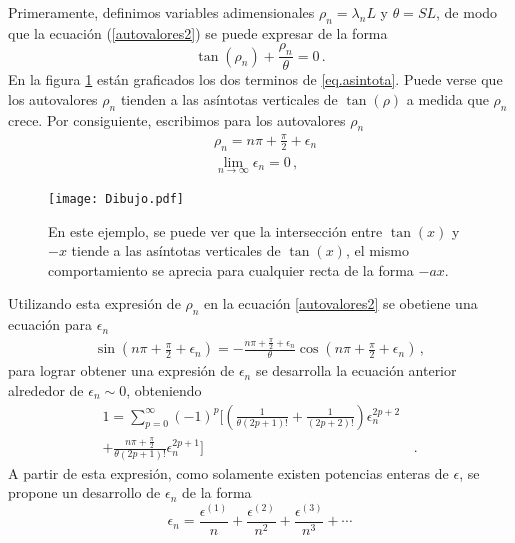 Primeramente, definimos variables adimensionales $\rho _n = \lambda _n L $ y $\theta = S L $, de modo que la ecuación (\ref{autovalores2}) se puede expresar de la forma
\begin{equation}
    \tan (\rho _n) + \frac{\rho _n}{\theta} = 0
    \, .
    \label{eq.asintota}
\end{equation}
En la figura \ref{fig:Dibujo1} están graficados los dos terminos de \ref{eq.asintota}. Puede verse que los autovalores $\rho _n$ tienden a las asíntotas verticales de $ \tan ( \rho ) $ a medida que $\rho _n$ crece. Por consiguiente, escribimos para los autovalores $\rho _n$ 
\begin{align}
    & \rho _n = n \pi + \frac{\pi}{2} + \epsilon _n 
\label{eq.mu}    
\\[5pt]
\nonumber
    & \lim \limits_{ n \rightarrow \infty} \epsilon _n = 0
\, ,
\end{align}
\begin{figure}
    \centering
    \texttt{[image: Dibujo.pdf]}
    \caption{En este ejemplo, se puede ver que la intersección entre $ \tan(x)$ y $-x$ tiende a las asíntotas verticales de $\tan (x) $, el mismo comportamiento se aprecia para cualquier recta de la forma $- a x$.}
    \label{fig:Dibujo1}
\end{figure}
Utilizando esta expresión de $\rho _n$ en la ecuación \eqref{autovalores2} se obetiene una ecuación para $\epsilon _n$
\begin{equation}
\begin{aligned}
    \sin \left( n \pi + \frac{\pi}{2} + \epsilon _n \right) = -
    \frac{n \pi + \frac{\pi}{2} + \epsilon _n}{\theta} \cos \left( n \pi + \frac{\pi}{2} + \epsilon _n\right)
    \, ,
\end{aligned}
\end{equation}
para lograr obtener una expresión de $\epsilon _n$ se desarrolla la ecuación anterior alrededor de $\epsilon  _n \sim 0$, obteniendo 
\begin{align}
\nonumber
    1 =     
    \sum _{p=0} ^{\infty} (-1) ^p    
    \Bigg[
   	\left( \frac{1}{\theta (2p+1)!  } + \frac{1}{(2p+2)!} \right) 			\epsilon _n ^{2p+2 } 
&   	
\\
\label{igualdad epsilon}
  	+ \frac{n \pi + \frac{\pi}{2}}{\theta (2p+1)! }   \epsilon _n ^{2p
  	+1}	\Bigg]
& 
  	\, .
\end{align}
A partir de esta expresión, como solamente existen potencias enteras de $\epsilon$, se propone un desarrollo de  $\epsilon _n$ de la forma
\begin{equation}
\label{eq.epsilon}
    \epsilon _n = 
    \frac{\epsilon ^{(1)}}{n}  + 
    \frac{\epsilon ^{(2)}}{n ^2}  + 
    \frac{\epsilon ^{(3)}}{n ^3}  + \dotsb
\end{equation}
